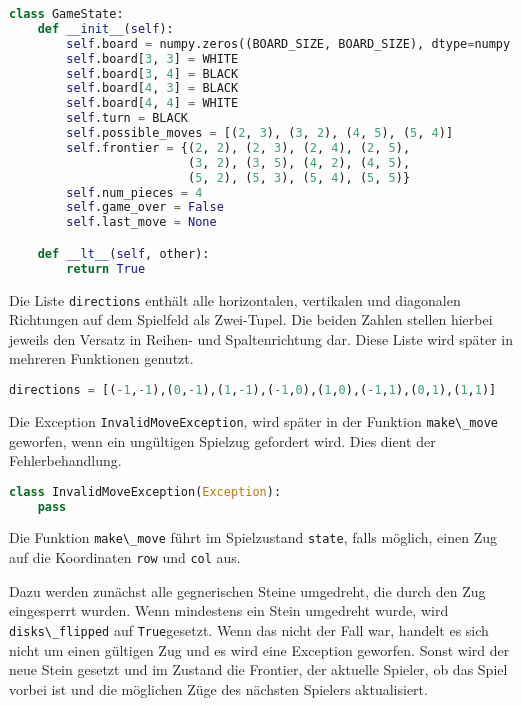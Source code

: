 \begin{lstlisting}[language=Python]
class GameState:
    def __init__(self):
        self.board = numpy.zeros((BOARD_SIZE, BOARD_SIZE), dtype=numpy.int8)
        self.board[3, 3] = WHITE
        self.board[3, 4] = BLACK
        self.board[4, 3] = BLACK
        self.board[4, 4] = WHITE
        self.turn = BLACK
        self.possible_moves = [(2, 3), (3, 2), (4, 5), (5, 4)]
        self.frontier = {(2, 2), (2, 3), (2, 4), (2, 5),
                         (3, 2), (3, 5), (4, 2), (4, 5),
                         (5, 2), (5, 3), (5, 4), (5, 5)}
        self.num_pieces = 4
        self.game_over = False
        self.last_move = None

    def __lt__(self, other):
        return True
\end{lstlisting}

Die Liste \passthrough{\lstinline!directions!} enthält alle
horizontalen, vertikalen und diagonalen Richtungen auf dem Spielfeld als
Zwei-Tupel. Die beiden Zahlen stellen hierbei jeweils den Versatz in
Reihen- und Spaltenrichtung dar. Diese Liste wird später in mehreren
Funktionen genutzt.

\begin{lstlisting}[language=Python]
directions = [(-1,-1),(0,-1),(1,-1),(-1,0),(1,0),(-1,1),(0,1),(1,1)]
\end{lstlisting}

Die Exception \passthrough{\lstinline!InvalidMoveException!}, wird
später in der Funktion \passthrough{\lstinline!make\_move!} geworfen,
wenn ein ungültigen Spielzug gefordert wird. Dies dient der
Fehlerbehandlung.

\begin{lstlisting}[language=Python]
class InvalidMoveException(Exception):
    pass
\end{lstlisting}

Die Funktion \passthrough{\lstinline!make\_move!} führt im Spielzustand
\passthrough{\lstinline!state!}, falls möglich, einen Zug auf die
Koordinaten \passthrough{\lstinline!row!} und
\passthrough{\lstinline!col!} aus.

Dazu werden zunächst alle gegnerischen Steine umgedreht, die durch den
Zug eingesperrt wurden. Wenn mindestens ein Stein umgedreht wurde, wird
\passthrough{\lstinline!disks\_flipped!} auf
\passthrough{\lstinline!True!}gesetzt. Wenn das nicht der Fall war,
handelt es sich nicht um einen gültigen Zug und es wird eine Exception
geworfen. Sonst wird der neue Stein gesetzt und im Zustand die Frontier,
der aktuelle Spieler, ob das Spiel vorbei ist und die möglichen Züge des
nächsten Spielers aktualisiert.

